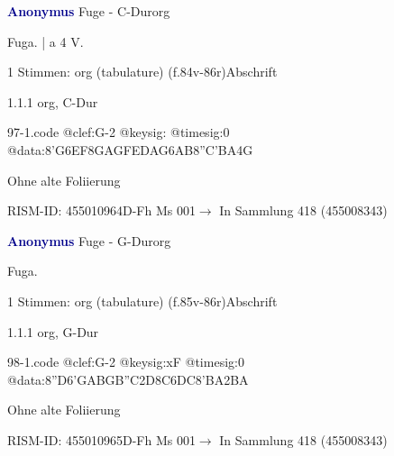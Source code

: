 \documentclass[twocolumn, 12pt]{book}
\begin{document}
\par \vspace{16pt} \textcolor{darkblue}{\textbf{Anonymus  }}\hfillplus{\textbf{[97]}}\newline Fuge - C-Dur\newline org
\par \begin{itshape}[f.84v, at left:] Fuga. | a 4 V.\end{itshape} 
\par \textcolor{darkblue}{}  1 Stimmen: org (tabulature)  (f.84v-86r)\newline Abschrift
\par 1.1.1  org, C-Dur  
\begin{filecontents*}{97-1.code}
@clef:G-2
@keysig:
@timesig:0
@data:{8'G6EF8GA}{GFED}{AG6AB8''C}{'BA}4G
\end{filecontents*}
\newline %
\par Ohne alte Foliierung
\par RISM-ID: 455010964\newline D-Fh  Ms 001\newline $\rightarrow$ In Sammlung 418 (455008343)
      
\par \vspace{16pt} \textcolor{darkblue}{\textbf{Anonymus  }}\hfillplus{\textbf{[98]}}\newline Fuge - G-Dur\newline org
\par \begin{itshape}[f.86r, at left:] Fuga.\end{itshape} 
\par \textcolor{darkblue}{}  1 Stimmen: org (tabulature)  (f.85v-86r)\newline Abschrift
\par 1.1.1  org, G-Dur  
\begin{filecontents*}{98-1.code}
@clef:G-2
@keysig:xF
@timesig:0
@data:{8''D6'GA}{BGB''C}2D{8C6DC}{8'BA}2BA
\end{filecontents*}
\newline %
\par Ohne alte Foliierung
\par RISM-ID: 455010965\newline D-Fh  Ms 001\newline $\rightarrow$ In Sammlung 418 (455008343)
      
\end{document}
